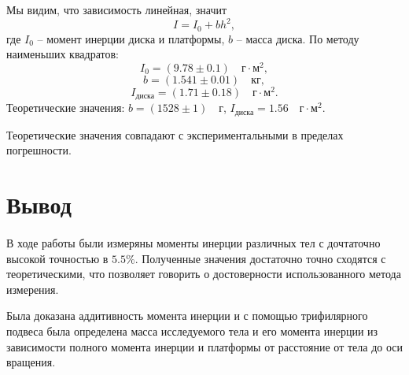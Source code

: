\documentclass[a4paper,12pt]{article}
\begin{document}
\begin{enumerate}
    Мы видим, что зависимость линейная, значит
    \begin{displaymath}
        I = I_0 + bh^2,
    \end{displaymath}
    где $I_0$ -- момент инерции диска и платформы, $b$ -- масса диска.
    По методу наименьших квадратов:
    \begin{displaymath}
        I_0 = (9.78 \pm 0.1) \quad г \cdot м^2,
    \end{displaymath}
    \begin{displaymath}
        b = (1.541 \pm 0.01)\quad кг,
    \end{displaymath}
    \begin{displaymath}
        I_{диска} = (1.71 \pm 0.18) \quad г \cdot м^2.
    \end{displaymath}
    Теоретические значения: $b = (1528 \pm 1) \quad г$, $I_{диска} = 1.56 \quad г \cdot м^2$.
    
    Теоретические значения совпадают с экспериментальными в пределах погрешности.

\end{enumerate}
	
\section{Вывод} 

\paragraph{}В ходе работы были измеряны моменты инерции различных тел с дочтаточно высокой точностью в $5.5 \%$. Полученные значения достаточно точно сходятся с теоретическими, что позволяет говорить о достоверности использованного метода измерения.

Была доказана аддитивность момента инерции и с помощью трифилярного подвеса была определена масса исследуемого тела и его момента инерции из зависимости полного момента инерции и платформы от расстояние от тела до оси вращения.
\end{document}
